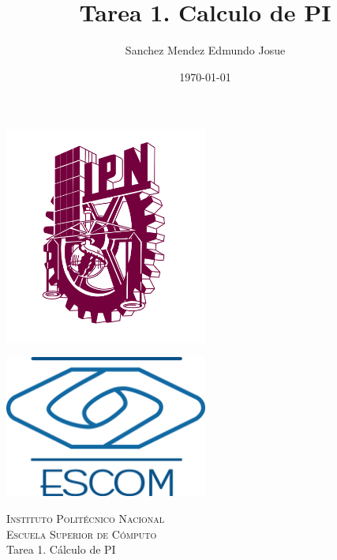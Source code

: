 \documentclass[11pt]{article}
\date{\today}
\title{Tarea 1. Calculo de PI}
\author{Sanchez Mendez Edmundo Josue}
\begin{document}
		\begin{titlepage}
			\begin{center}
				
				
				\noindent
				\begin{minipage}{0.5\textwidth}
					\begin{flushleft} \large
						\includegraphics[width=0.5\textwidth]{resources/ipn.png}
					\end{flushleft}
				\end{minipage}%
				\begin{minipage}{0.55\textwidth}
					\begin{flushright} \large
						\includegraphics[width=0.5\textwidth]{resources/escom.png}
					\end{flushright}
				\end{minipage}
				
				\textsc{\LARGE Instituto Politécnico Nacional}\\[0.5cm]
				
				\textsc{\Large Escuela Superior de Cómputo}\\[1cm]
				
				
				{ \huge Tarea 1. Cálculo de PI  \\[1cm] }
				

\end{center}
\end{titlepage}
\end{document}
